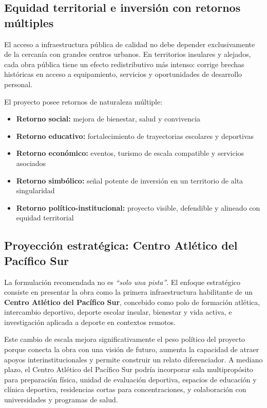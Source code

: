 \documentclass[12pt, a4paper]{article}
\begin{document}
\subsection{Equidad territorial e inversión con retornos múltiples}

El acceso a infraestructura pública de calidad no debe depender exclusivamente
de la cercanía con grandes centros urbanos. En territorios insulares y alejados,
cada obra pública tiene un efecto redistributivo más intenso: corrige brechas
históricas en acceso a equipamiento, servicios y oportunidades de desarrollo personal.

El proyecto posee retornos de naturaleza múltiple:

\begin{itemize}[leftmargin=*, itemsep=3pt]
  \item \textbf{Retorno social:} mejora de bienestar, salud y convivencia
  \item \textbf{Retorno educativo:} fortalecimiento de trayectorias escolares y deportivas
  \item \textbf{Retorno económico:} eventos, turismo de escala compatible y servicios asociados
  \item \textbf{Retorno simbólico:} señal potente de inversión en un territorio de alta singularidad
  \item \textbf{Retorno político-institucional:} proyecto visible, defendible y alineado con equidad territorial
\end{itemize}

\subsection{Proyección estratégica: Centro Atlético del Pacífico Sur}
\label{sec:centro_pacifico}

La formulación recomendada no es \textit{``solo una pista''}. El enfoque
estratégico consiste en presentar la obra como la primera infraestructura
habilitante de un \textbf{Centro Atlético del Pacífico Sur}, concebido como
polo de formación atlética, intercambio deportivo, deporte escolar insular,
bienestar y vida activa, e investigación aplicada a deporte en contextos remotos.

Este cambio de escala mejora significativamente el peso político del proyecto
porque conecta la obra con una visión de futuro, aumenta la capacidad de atraer
apoyos interinstitucionales y permite construir un relato diferenciador.
A mediano plazo, el Centro Atlético del Pacífico Sur podría incorporar sala
multipropósito para preparación física, unidad de evaluación deportiva, espacios
de educación y clínica deportiva, residencias cortas para concentraciones, y
colaboración con universidades y programas de salud.
\end{document}

